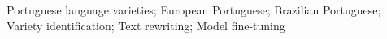 \acresetall
\noindent Portuguese language varieties; European Portuguese; Brazilian Portuguese; Variety identification; Text rewriting; Model fine-tuning
